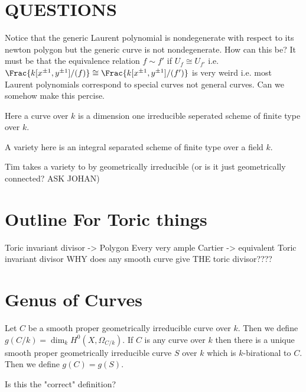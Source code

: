 \documentclass[12pt]{article}
\begin{document}
\tableofcontents

\section{QUESTIONS}

Notice that the generic Laurent polynomial is nondegenerate with respect to its newton polygon but the generic curve is not nondegenerate. How can this be? It must be that the equivalence relation $f \sim f'$ if $U_f \cong U_{f'}$ i.e. $\Frac{k[x^{\pm 1},y^{\pm 1}]/(f)} \cong \Frac{k[x^{\pm 1},y^{\pm 1}] / (f')}$ is very weird i.e. most Laurent polynomials correspond to special curves not general curves. Can we somehow make this percise. 

\begin{definition}
Here a curve over $k$ is a dimension one irreducible seperated scheme of finite type over $k$. 
\end{definition}

\begin{defn}
A variety here is an integral separated scheme of finite type over a field $k$.
\end{defn}

\begin{rmk}
Tim takes a variety to by geometrically irreducible (or is it just geometrically connected? ASK JOHAN)
\end{rmk}

\section{Outline For Toric things}

Toric invariant divisor -> Polygon
Every very ample Cartier -> equivalent Toric invariant divisor
WHY does any smooth curve give THE toric divisor????

\section{Genus of Curves}

\begin{defn}
Let $C$ be a smooth proper geometrically irreducible curve over $k$. Then we define $g(C/k) = \dim_k H^0(X, \Omega_{C / k})$. If $C$ is any curve over $k$ then there is a unique smooth proper geometrically irreducible curve $S$ over $k$ which is $k$-birational to $C$. Then we define $g(C) = g(S)$. 
\end{defn}

\begin{question}
Is this the "correct" definition?
\end{question}
\end{document}
